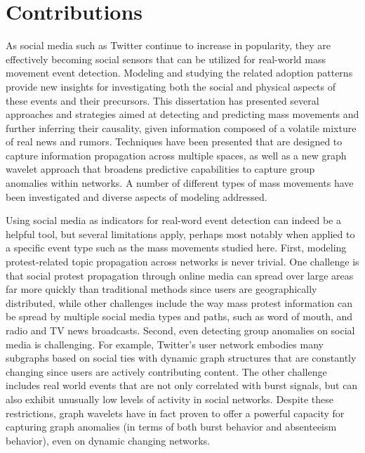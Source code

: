 \section{Contributions}
As social media such as Twitter continue to increase in popularity, they are effectively becoming social sensors that can be utilized for real-world mass movement event detection. Modeling and studying the related adoption patterns provide new insights for investigating both the social and physical aspects of these events and their precursors. This dissertation has presented several approaches and strategies aimed at detecting and predicting mass movements and further inferring their causality, given information composed of a volatile mixture of real news and rumors. Techniques have been presented that are designed to capture information propagation across multiple spaces, as well as a new graph wavelet approach that broadens predictive capabilities to capture group anomalies within networks. A number of different types of mass movements have been investigated and diverse aspects of modeling addressed.

Using social media as indicators for real-word event detection can indeed be a helpful tool, but several limitations apply, perhaps most notably when applied to a specific event type such as the mass movements studied here. First, modeling protest-related topic propagation across networks is never trivial. One challenge is that social protest propagation through online media can spread over large areas far more quickly than traditional methods since users are geographically distributed, while other challenges include the way mass protest information can be spread by multiple social media types and paths, such as word of mouth, and radio and TV news broadcasts. Second, even detecting group anomalies on social media is challenging. For example, Twitter's user network embodies many subgraphs based on social ties with dynamic graph structures that are constantly changing since users are actively contributing content. The other challenge includes real world events that are not only correlated with burst signals, but can also exhibit unusually low levels of activity in social networks. Despite these restrictions, graph wavelets have in fact proven to offer a powerful capacity for capturing graph anomalies (in terms of both burst behavior and absenteeism behavior), even on dynamic changing networks.


